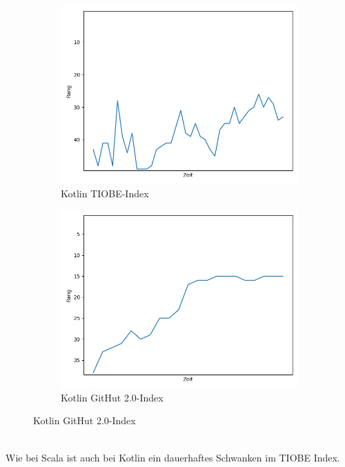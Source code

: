 \documentclass[ngerman]{article}
\begin{document}
    \begin{figure}[h!]
        \begin{subfigure}[h!]{.5\textwidth}
            \caption{Kotlin TIOBE-Index}
            \centering
            \includegraphics[scale=.25]{KotlinTIOBE.png}
        \end{subfigure}
        \begin{subfigure}[h!]{.5\textwidth}
            \caption{Kotlin GitHut 2.0-Index}
            \centering
            \includegraphics[scale=.25]{KotlinGitHut.png}
        \end{subfigure}
    \end{figure}\\
    Wie bei Scala ist auch bei Kotlin ein dauerhaftes Schwanken im TIOBE Index.\\
\end{document}
